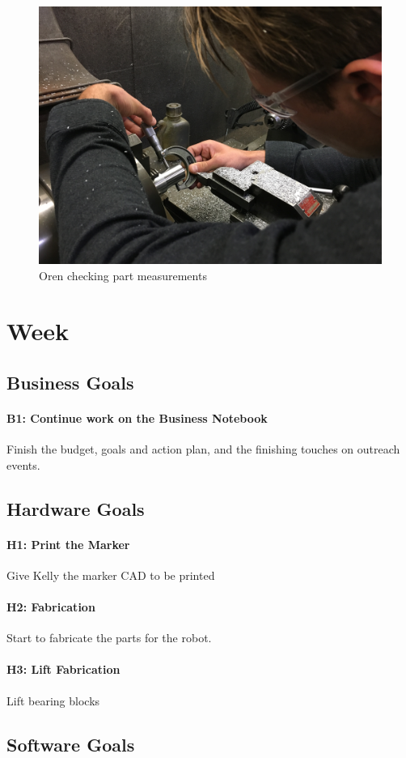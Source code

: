 \documentclass{article}
\begin{document}
\begin{figure}
    \centering
    \includegraphics[width=.6 \textwidth]{08_10-22/images/IMG_0330.JPG}
    \caption{Oren checking part measurements}
    \label{fig: Turning Inserts}
\end{figure}

\clearpage \newpage \section{Week \thesection} 
\subsection{Business Goals}
\paragraph{B1: Continue work on the Business Notebook}
 Finish the budget, goals and action plan, and the finishing touches on outreach events.
\subsection{Hardware Goals}
\paragraph{H1: Print the Marker}
 Give Kelly the marker CAD to be printed
\paragraph{H2: Fabrication}
 Start to fabricate the parts for the robot.
\paragraph{H3: Lift Fabrication}
 Lift bearing blocks 
\subsection{Software Goals}
\end{document}

